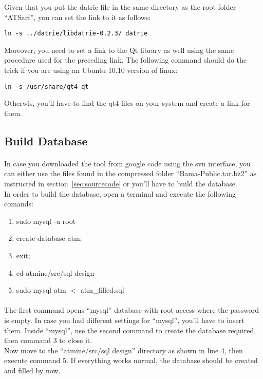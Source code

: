 \documentclass{article}
\begin{document}
Given that you put the datrie file in the same directory as the root folder ``ATSarf'', you can set the link to it as follows:
\begin{verbatim}
ln -s ../datrie/libdatrie-0.2.3/ datrie
\end{verbatim}

Moreover, you need to set a link to the Qt library as well using the same procedure used for the preceding link. 
The following command should do the trick if you are using an Ubuntu 10.10 version of linux:
\begin{verbatim}
ln -s /usr/share/qt4 qt
\end{verbatim}
Otherwis, you'll have to find the qt4 files on your system and create a link for them.

\subsection{Build Database}

\paragraph{}
In case you downloaded the tool from google code using the svn interface, you can either use the files found in the compressed folder ``Bama-Public.tar.bz2'' as instructed in section~\ref{sec:sourcecode} or you'll have to build the database.\\
In order to build the database, open a terminal and execute the following comands:

\begin{enumerate}
\item sudo mysql -u root
\item create database atm;
\item exit;
\item cd atmine/src/sql design
\item sudo mysql atm $<$ atm\_filled.sql
\end{enumerate}

\paragraph{}
The first command opens ``mysql'' database with root access where the password is empty. In case you had different settings for ``mysql'', you'll have to insert them. Inside ``mysql'', use the second command to create the database required, then command 3 to close it.\\
Now move to the ``atmine/src/sql design'' directory as shown in line 4, then execute command 5. If everything works normal, the database should be created and filled by now.
\end{document}
